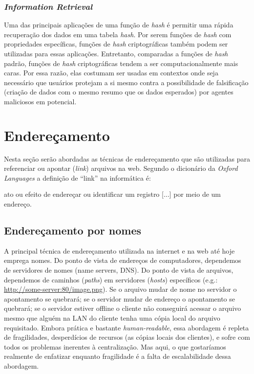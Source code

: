 \subsubsection{\textit{Information Retrieval}}

Uma das principais aplicações de uma função de \textit{hash} é permitir uma rápida recuperação dos dados em uma tabela \textit{hash}.
Por serem funções de \textit{hash} com propriedades específicas, funções de \textit{hash} criptográficas também podem ser utilizadas para essas aplicações.
Entretanto, comparadas a funções de \textit{hash} padrão, funções de \textit{hash} criptográficas tendem a ser computacionalmente mais caras.
Por essa razão, elas costumam ser usadas em contextos onde seja necessário que usuários protejam a si mesmo contra a possibilidade de falsificação (criação de dados com o mesmo resumo que os dados esperados) por agentes maliciosos em potencial.

\section{Endereçamento}

Nesta seção serão abordadas as técnicas de endereçamento que são utilizadas para referenciar ou apontar (\textit{link}) arquivos na web.
Segundo o dicionário da \textit{Oxford Languages} a definição de ``link'' na informática é: 

\begin{directcite}
ato ou efeito de endereçar ou identificar um registro [...] por meio de um endereço.
\end{directcite}

\subsection{Endereçamento por nomes}

A principal técnica de endereçamento utilizada na internet e na web até hoje emprega nomes.
Do ponto de vista de endereços de computadores, dependemos de servidores de nomes (name servers, DNS).
Do ponto de vista de arquivos, dependemos de caminhos (\textit{paths}) em servidores (\textit{hosts}) específicos (e.g.: \url{http://some-server:80/image.png}).
Se o arquivo mudar de nome no servidor o apontamento se quebrará; se o servidor mudar de endereço o apontamento se quebrará; se o servidor estiver offline o cliente não conseguirá acessar o arquivo mesmo que alguém na LAN do cliente tenha uma cópia local do arquivo requisitado.
Embora prática e bastante \textit{human-readable}, essa abordagem é repleta de fragilidades, desperdícios de recursos (as cópias locais dos clientes), e sofre com todos os problemas inerentes à centralização. Mas aqui, o que gostaríamos realmente de enfatizar enquanto fragilidade é a falta de escalabilidade dessa abordagem.

